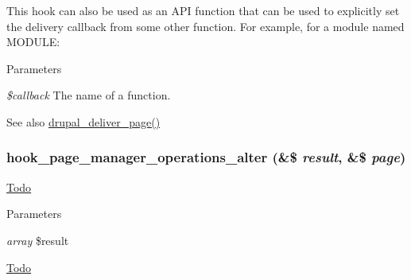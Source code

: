 This hook can also be used as an API function that can be used to explicitly set the delivery callback from some other function. For example, for a module named MODULE: 



\begin{DoxyParams}{Parameters}
\item[{\em \$callback}]The name of a function.\end{DoxyParams}
\begin{DoxySeeAlso}{See also}
\hyperlink{common_8inc_a1537b4ccc064fb7d8106effcac8caac3}{drupal\_\-deliver\_\-page()} 
\end{DoxySeeAlso}
\hypertarget{group__hooks_gadade57abdccc892f62ed6bc7f089ca29}{
\subsubsection[{hook\_\-page\_\-manager\_\-operations\_\-alter}]{\setlength{\rightskip}{0pt plus 5cm}hook\_\-page\_\-manager\_\-operations\_\-alter (\&\$ {\em result}, \/  \&\$ {\em page})}}
\label{group__hooks_gadade57abdccc892f62ed6bc7f089ca29}
\begin{Desc}
\item[\hyperlink{todo__todo000037}{Todo}]\end{Desc}

\begin{DoxyParams}{Parameters}
\item[{\em array}]\$result \end{DoxyParams}
\begin{Desc}
\item[\hyperlink{todo__todo000038}{Todo}]\end{Desc}

